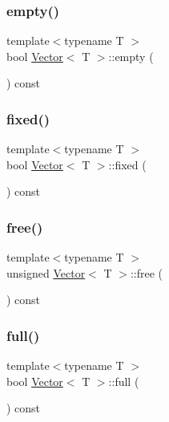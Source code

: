 \mbox{\label{classVector_ad688a8a0dfbd07ea63d838058a436f79}} 
\subsubsection{\texorpdfstring{empty()}{empty()}}
{\footnotesize\ttfamily template$<$typename T $>$ \\
bool \hyperlink{classVector}{Vector}$<$ T $>$\+::empty (\begin{DoxyParamCaption}{ }\end{DoxyParamCaption}) const}

\mbox{\label{classVector_ada65b076d4102d21479cdb00fec6b6a1}} 
\subsubsection{\texorpdfstring{fixed()}{fixed()}}
{\footnotesize\ttfamily template$<$typename T $>$ \\
bool \hyperlink{classVector}{Vector}$<$ T $>$\+::fixed (\begin{DoxyParamCaption}{ }\end{DoxyParamCaption}) const}

\mbox{\label{classVector_a1c11aef701f6eb3194946594d064af09}} 
\subsubsection{\texorpdfstring{free()}{free()}}
{\footnotesize\ttfamily template$<$typename T $>$ \\
unsigned \hyperlink{classVector}{Vector}$<$ T $>$\+::free (\begin{DoxyParamCaption}{ }\end{DoxyParamCaption}) const}

\mbox{\label{classVector_a31a67e97a324510bff15ea79c64839af}} 
\subsubsection{\texorpdfstring{full()}{full()}}
{\footnotesize\ttfamily template$<$typename T $>$ \\
bool \hyperlink{classVector}{Vector}$<$ T $>$\+::full (\begin{DoxyParamCaption}{ }\end{DoxyParamCaption}) const}

